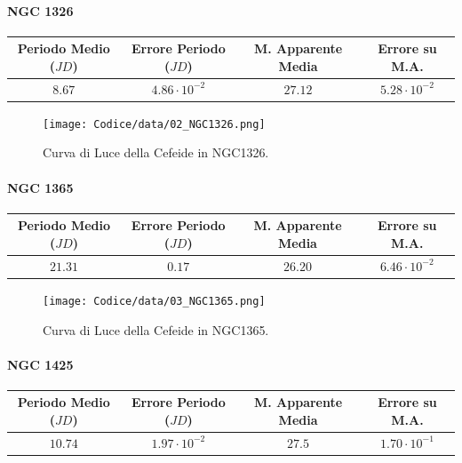 \documentclass{article}
\newcommand{\e}[1]{\cdot 10^{#1}} %
\begin{document}
\paragraph{NGC 1326}
\begin{center}
  \begin{tabular}{cccc}
  \toprule
  Periodo Medio ($JD$) & Errore Periodo ($JD$) & M. Apparente Media &
                                                                  Errore
                                                                      su
                                                                      M.A. \\
  \midrule
  $8.67$ & $4.86\e{-2}$ & $27.12$ & $5.28\e{-2}$ \\
  \bottomrule
 \end{tabular}
\end{center}

\begin{figure}[H]
  \centering
  \texttt{[image: Codice/data/02\_NGC1326.png]}
  \caption{Curva di Luce della Cefeide in NGC1326.}
\end{figure}

\paragraph{NGC 1365}
\begin{center}
  \begin{tabular}{cccc}
  \toprule
  Periodo Medio ($JD$) & Errore Periodo ($JD$) & M. Apparente Media &
                                                                  Errore
                                                                      su
                                                                      M.A. \\
  \midrule
  $21.31$ & $0.17$ & $26.20$ & $6.46\e{-2}$ \\
  \bottomrule
 \end{tabular}
\end{center}

\begin{figure}[H]
  \centering
  \texttt{[image: Codice/data/03\_NGC1365.png]}
  \caption{Curva di Luce della Cefeide in NGC1365.}
\end{figure}

\paragraph{NGC 1425}
\begin{center}
  \begin{tabular}{cccc}
  \toprule
  Periodo Medio ($JD$) & Errore Periodo ($JD$) & M. Apparente Media &
                                                                  Errore
                                                                      su
                                                                      M.A. \\
  \midrule
  $10.74$ & $1.97\e{-2}$ & $27.5$ & $1.70\e{-1}$ \\
  \bottomrule
 \end{tabular}
\end{center}
\end{document}
